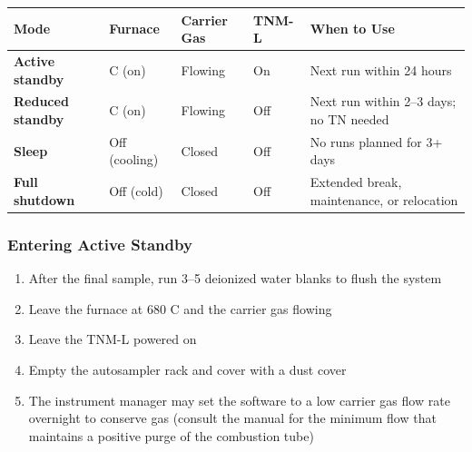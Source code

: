 \documentclass[
  11pt,
  letterpaper,
]{article}
\newcounter{none} %
\providecommand{\tightlist}{%
  \setlength{\itemsep}{0pt}\setlength{\parskip}{0pt}}
\begin{document}
{\def\LTcaptype{none} %
\begin{longtable}[]{@{}
  >{\raggedright\arraybackslash}p{}
  >{\raggedright\arraybackslash}p{}
  >{\raggedright\arraybackslash}p{}
  >{\raggedright\arraybackslash}p{}
  >{\raggedright\arraybackslash}p{}@{}}
\toprule\noalign{}
\begin{minipage}[b]{\linewidth}\raggedright
Mode
\end{minipage} & \begin{minipage}[b]{\linewidth}\raggedright
Furnace
\end{minipage} & \begin{minipage}[b]{\linewidth}\raggedright
Carrier Gas
\end{minipage} & \begin{minipage}[b]{\linewidth}\raggedright
TNM-L
\end{minipage} & \begin{minipage}[b]{\linewidth}\raggedright
When to Use
\end{minipage} \\
\midrule\noalign{}
\endhead
\bottomrule\noalign{}
\endlastfoot
\textbf{Active standby} & 680 C (on) & Flowing & On & Next run within 24
hours \\
\textbf{Reduced standby} & 680 C (on) & Flowing & Off & Next run within
2--3 days; no TN needed \\
\textbf{Sleep} & Off (cooling) & Closed & Off & No runs planned for 3+
days \\
\textbf{Full shutdown} & Off (cold) & Closed & Off & Extended break,
maintenance, or relocation \\
\end{longtable}
}

\subsubsection{Entering Active Standby}\label{entering-active-standby}

\begin{enumerate}
\def\labelenumi{\arabic{enumi}.}
\tightlist
\item
  After the final sample, run 3--5 deionized water blanks to flush the
  system
\item
  Leave the furnace at 680 C and the carrier gas flowing
\item
  Leave the TNM-L powered on
\item
  Empty the autosampler rack and cover with a dust cover
\item
  The instrument manager may set the software to a low carrier gas flow
  rate overnight to conserve gas (consult the manual for the minimum
  flow that maintains a positive purge of the combustion tube)
\end{enumerate}
\end{document}
